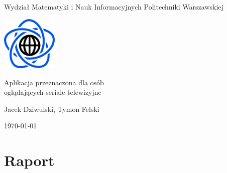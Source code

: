 \documentclass[10pt,a4paper]{article}
\begin{document}
\begin{titlepage}
	\centering
	{\Large Wydział Matematyki i Nauk Informacyjnych Politechniki Warszawskiej \par}
	\vspace{1cm}
	\includegraphics[width=0.2\textwidth]{Resources/Images/logo.png} \par
	\vspace{5cm}
	{\LARGE Aplikacja przeznaczona dla osób\\oglądających seriale telewizyjne \par}
	\vspace{0.5cm}
	{\Large Jacek Dziwulski, Tymon Felski \par}
	\vspace{1.5cm}
	{\Large \today \par}
\end{titlepage}

\newpage
\tableofcontents

\newpage
\section{Raport}
\end{document}
